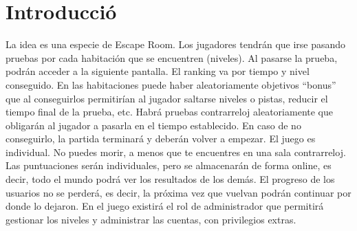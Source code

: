 \section{Introducció}\label{sec:intro}


La idea es una especie de Escape Room. Los jugadores tendrán que irse pasando pruebas por cada habitación que se encuentren (niveles). Al pasarse la prueba, podrán acceder a la siguiente pantalla. El ranking va por tiempo y nivel conseguido. En las habitaciones puede haber aleatoriamente objetivos “bonus” que al conseguirlos permitirían al jugador saltarse niveles o pistas, reducir el tiempo final de la prueba, etc.
Habrá pruebas contrarreloj aleatoriamente que obligarán al jugador a pasarla en el tiempo establecido. En caso de no conseguirlo, la partida terminará y deberán volver a empezar.
El juego es individual. No puedes morir, a menos que te encuentres en una sala contrarreloj. 
Las puntuaciones serán individuales, pero se almacenarán de forma online, es decir, todo el mundo podrá ver los resultados de los demás. 
El progreso de los usuarios no se perderá, es decir, la próxima vez que vuelvan podrán continuar por donde lo dejaron.
En el juego existirá el rol de administrador que permitirá gestionar los niveles y administrar las cuentas, con privilegios extras.


